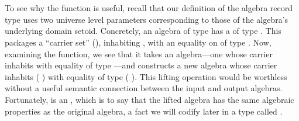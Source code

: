 \begin{code}%
\>[0]\<%
\\
\>[0]\AgdaSpace{}%
\AgdaSymbol{:}\AgdaSpace{}%
\AgdaSymbol{(}\AgdaSpace{}%
\AgdaSymbol{:}\AgdaSpace{}%
\AgdaSpace{}%
\AgdaSpace{}%
\AgdaSymbol{)(}\AgdaSpace{}%
\AgdaSpace{}%
\AgdaSymbol{:}\AgdaSpace{}%
\AgdaSymbol{)}\AgdaSpace{}%
\AgdaSpace{}%
\AgdaSpace{}%
\AgdaSymbol{(}\AgdaSpace{}%
\AgdaSpace{}%
\AgdaSymbol{)}\AgdaSpace{}%
\AgdaSymbol{(}\AgdaSpace{}%
\AgdaSpace{}%
\AgdaSymbol{)}\<%
\end{code}
\ifshort
\vskip2mm
\else
\begin{code}%
\>[0]\AgdaSpace{}%
\AgdaSpace{}%
\AgdaSpace{}%
\AgdaSpace{}%
\AgdaSymbol{=}\AgdaSpace{}%
\AgdaSpace{}%
\AgdaSymbol{(}\AgdaSpace{}%
\AgdaSpace{}%
\AgdaSymbol{)}\AgdaSpace{}%
\<%
\\
\>[0]\<%
\end{code}
\fi
\noindent To see why the  function is useful, recall that our definition of the algebra
record type uses two universe level parameters corresponding to those of the algebra's
underlying domain setoid. Concretely, an algebra of type    has a
 of type   . This packages a ``carrier set''
(), inhabiting  , with an equality on  of type
  . Now, examining the  function, we see that it
takes an algebra---one whose carrier inhabits  with equality
of type   ---and constructs a new algebra whose carrier
inhabits  (  ) with equality of type  
(  ). This lifting operation would be worthless without a useful
semantic connection between the input and output algebras.
Fortunately,  is an , which is
to say that the lifted algebra has the same algebraic properties as the original algebra,
a fact we will codify later in a type called .

